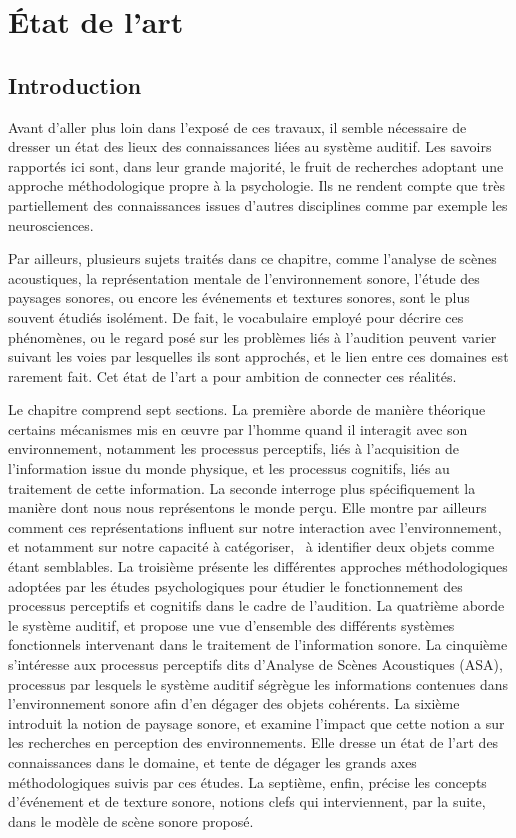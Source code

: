 \chapter{État de l'art}\label{ch:psycho_ea}

\section{Introduction}

Avant d'aller plus loin dans l'exposé de ces travaux, il semble nécessaire de dresser un état des lieux des connaissances liées au système auditif. Les savoirs rapportés ici sont, dans leur grande majorité, le fruit de recherches adoptant une approche méthodologique propre à la psychologie. Ils ne rendent compte que très partiellement des connaissances issues d'autres disciplines comme par exemple les neurosciences.

Par ailleurs, plusieurs sujets traités dans ce chapitre, comme l'analyse de scènes acoustiques, la représentation mentale de l'environnement sonore, l'étude des paysages sonores, ou encore les événements et textures sonores, sont le plus souvent étudiés isolément. De fait, le vocabulaire employé pour décrire ces phénomènes, ou le regard posé sur les problèmes liés à l'audition peuvent varier suivant les voies par lesquelles ils sont approchés, et le lien entre ces domaines est rarement fait. Cet état de l'art a pour ambition de connecter ces réalités.

Le chapitre comprend sept sections. La première aborde de manière théorique certains mécanismes mis en œuvre par l'homme quand il interagit avec son environnement, notamment les processus perceptifs, liés à l'acquisition de l'information issue du monde physique, et les processus cognitifs, liés au traitement de cette information. La seconde interroge plus spécifiquement la manière dont nous nous représentons le monde perçu. Elle montre par ailleurs comment ces représentations influent sur notre interaction avec l'environnement, et notamment sur notre capacité à catégoriser, \ie~à identifier deux objets comme étant semblables. La troisième présente les différentes approches méthodologiques adoptées par les études psychologiques pour étudier le fonctionnement des processus perceptifs et cognitifs dans le cadre de l'audition. La quatrième aborde le système auditif, et propose une vue d'ensemble des différents systèmes fonctionnels intervenant dans le traitement de l'information sonore. La cinquième s'intéresse aux processus perceptifs dits d'Analyse de Scènes Acoustiques (ASA), processus par lesquels le système auditif ségrègue les informations contenues dans l'environnement sonore afin d'en dégager des objets cohérents. La sixième introduit la notion de paysage sonore, et examine l'impact que cette notion a sur les recherches en perception des environnements. Elle dresse un état de l'art des connaissances dans le domaine, et tente de dégager les grands axes méthodologiques suivis par ces études. La septième, enfin, précise les concepts d'événement et de texture sonore, notions clefs qui interviennent, par la suite, dans le modèle de scène sonore proposé.

